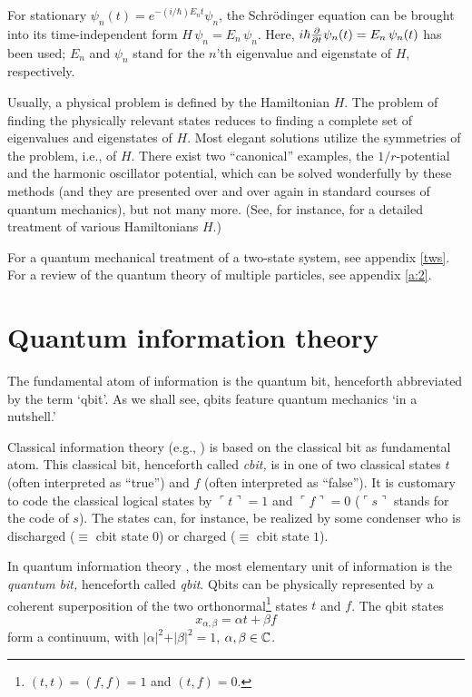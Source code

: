 \begin{description}
For stationary $ \psi_n
(t)=
e^{-(i/\hbar )E_nt}  \psi_n $, the Schr\"odinger equation
can be brought into its time-independent form
$H\, \psi_n
=
E_n\, \psi_n $.
Here,
$i\hbar {\partial \over \partial t} \psi_n (t)
=
E_n \, \psi_n (t) $  has been used;
$E_n$
and $\psi_n $
stand for the $n$'th eigenvalue and eigenstate of
$H$, respectively.

Usually, a physical problem is defined by the Hamiltonian ${H}$.
The problem of finding the physically relevant states reduces to finding
a complete set of eigenvalues and eigenstates of ${H}$.
Most elegant solutions utilize the symmetries of the problem, i.e., of
${H}$. There exist two ``canonical'' examples, the $1/r$-potential
and
the harmonic oscillator potential, which can be solved wonderfully by
these methods (and they are presented over and over again in standard
courses of quantum mechanics), but not many more. (See, for instance,
\cite{davydov} for a detailed treatment of various Hamiltonians ${H}$.)
\end{description}

For a quantum mechanical treatment of a two-state system, see appendix
\ref{tws}.
For a review of the quantum theory of multiple particles, see appendix
\ref{a:2}.


\section{Quantum information theory}
The fundamental atom of information is the quantum bit, henceforth
abbreviated by the term `qbit'. As we shall see, qbits feature quantum
mechanics `in a nutshell.'


Classical information theory (e.g., \cite{hamming}) is based on the
classical bit as
fundamental atom. This classical bit, henceforth called
{\em cbit,} is in one of two
classical states $t$ (often interpreted as ``true'') and $f$ (often
interpreted as ``false'').
It is customary to code the classical logical states by
$\ulcorner t\urcorner =1$ and
$\ulcorner f\urcorner =0$ ($
\ulcorner
s
\urcorner$ stands for the code of $s$).
The states can, for instance, be realized by some
condenser who is discharged ($\equiv$ cbit state $0$) or charged
($\equiv$ cbit state $1$).

In quantum information theory
\cite{albert,deutsch,feynman-85,benioff-82a,benioff-86,deutsch:89,deutsch:92},
the most elementary unit of information is
 the {\em quantum bit,}
henceforth called {\em qbit}.
Qbits can be physically represented by a coherent
superposition
of the two orthonormal\footnote{
$(t,t)=(f,f)=1$ and $(t,f)=0$.}
 states $t$ and $f$.
The qbit states
\begin{equation}
x_{\alpha ,\beta}  =\alpha t+\beta f
\end{equation}
form a continuum, with
$ \vert \alpha \vert^2+\vert \beta \vert^2=1$, $\alpha ,\beta \in {\Bbb
C}$.


